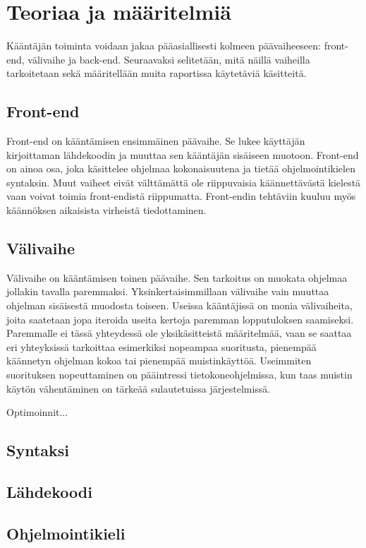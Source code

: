 
\section{Teoriaa ja määritelmiä}
Kääntäjän toiminta voidaan jakaa pääasiallisesti kolmeen päävaiheeseen:
front-end, välivaihe ja back-end.
Seuraavaksi selitetään, mitä näillä vaiheilla tarkoitetaan
sekä määritellään muita raportissa käytetäviä käsitteitä.


\subsection{Front-end}
Front-end on kääntämisen ensimmäinen päävaihe.
Se lukee käyttäjän kirjoittaman lähdekoodin
ja muuttaa sen kääntäjän sisäiseen muotoon.
Front-end on ainoa osa, joka käsittelee ohjelmaa kokonaisuutena
ja tietää ohjelmointikielen syntaksin.
Muut vaiheet eivät välttämättä ole riippuvaisia käännettävästä
kielestä vaan voivat toimia front-endistä riippumatta.
Front-endin tehtäviin kuuluu myös käännöksen aikaisista virheistä tiedottaminen.

\subsection{Välivaihe}
Välivaihe on kääntämisen toinen päävaihe.
Sen tarkoitus on muokata ohjelmaa jollakin tavalla paremmaksi.
Yksinkertaisimmillaan välivaihe vain muuttaa ohjelman sisäisestä
muodosta toiseen.
Useissa kääntäjissä on monia välivaiheita, joita saatetaan jopa
iteroida useita kertoja paremman lopputuloksen saamiseksi.
Paremmalle ei tässä yhteydessä ole yksikäsitteistä määritelmää,
vaan se saattaa eri yhteyksissä tarkoittaa esimerkiksi
nopeampaa suoritusta, pienempää käännetyn ohjelman kokoa
tai pienempää muistinkäyttöä. Useimmiten suorituksen nopeuttaminen
on pääintressi tietokoneohjelmissa, kun taas muistin käytön
vähentäminen on tärkeää sulautetuissa järjestelmissä.

Optimoinnit...


\subsection{Syntaksi}
\subsection{Lähdekoodi}
\subsection{Ohjelmointikieli}